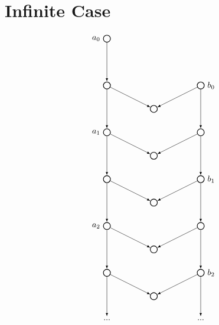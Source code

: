 \section{Infinite Case}
\label{sec:Infinite Case}
\[
  \begin{tikzpicture}
    [
    point/.style={thick,circle,draw,inner sep=0pt,minimum size=3mm},
    trimmed/.style={thick,draw=red},
    untrimmed/.style={thick,draw=black}
    ]
    \node (A0) at (0,12) [point,label=left:$a_0$] {};
    \node (A1) at (0,10) [point] {};
    \node (B1) at (4,10) [point,label=right:$b_0$] {};
    \node (C1) at (2,9) [point] {};
    \node (A2) at (0,8) [point,label=left:$a_1$] {};
    \node (B2) at (4,8) [point] {};
    \node (C2) at (2,7) [point] {};
    \node (A3) at (0,6) [point] {};
    \node (B3) at (4,6) [point,label=right:$b_1$] {};
    \node (C3) at (2,5) [point] {};
    \node (A4) at (0,4) [point,label=left:$a_2$] {};
    \node (B4) at (4,4) [point] {};
    \node (C4) at (2,3) [point] {};
    \node (A5) at (0,2) [point] {};
    \node (B5) at (4,2) [point,label=right:$b_2$] {};
    \node (C5) at (2,1) [point] {};
    \node (A6) at (0,0) [] {...};
    \node (B6) at (4,0) [] {...};
    \draw [-latex] (A0) to (A1);
    \draw [-latex] (A1) to (A2);
    \draw [-latex] (A1) to (C1);
    \draw [-latex] (B1) to (B2);
    \draw [-latex] (B1) to (C1);
    \draw [-latex] (A2) to (A3);
    \draw [-latex] (A2) to (C2);
    \draw [-latex] (B2) to (B3);
    \draw [-latex] (B2) to (C2);
    \draw [-latex] (A3) to (A4);
    \draw [-latex] (A3) to (C3);
    \draw [-latex] (B3) to (B4);
    \draw [-latex] (B3) to (C3);
    \draw [-latex] (A4) to (A5);
    \draw [-latex] (A4) to (C4);
    \draw [-latex] (B4) to (B5);
    \draw [-latex] (B4) to (C4);
    \draw [-latex] (A5) to (A6);
    \draw [-latex] (A5) to (C5);
    \draw [-latex] (B5) to (B6);
    \draw [-latex] (B5) to (C5);
  \end{tikzpicture}
\]
